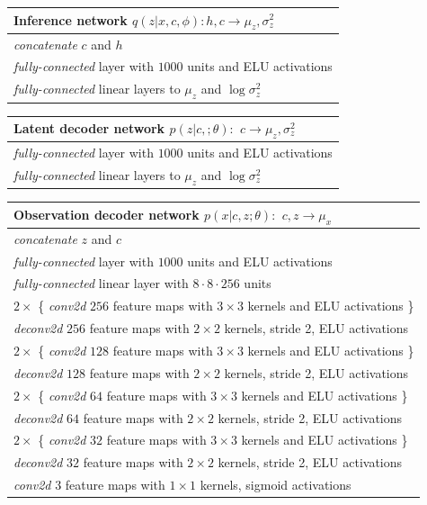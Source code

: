 \documentclass{article} %
\begin{document}
\begin{table}[H]

    \begin{tabular}{  l}
    \bf{Inference network} $q(z | x,c, \phi): h,c \to \mu_z, \sigma^2_z$ \\ \hline
    \emph{concatenate} $c$ and $h$ \\
    \emph{fully-connected} layer with $1000$ units and ELU activations\\
    \emph{fully-connected} linear layers to $\mu_z$ and $\log \sigma^2_z$
    \label{table:faces_inference_network}
    \end{tabular}
\end{table}
\begin{table}[H]

    \begin{tabular}{  l}
    \bf{Latent decoder network} $p(z | c,; \theta):$ $c \to \mu_z, \sigma^2_z$ \\ \hline
    \emph{fully-connected} layer with $1000$ units and ELU activations\\
    \emph{fully-connected} linear layers to $\mu_z$ and $\log \sigma^2_z$
    \label{table:faces_latent_decoder_network}
    \end{tabular}   
\end{table}

\begin{table}[H]

    \begin{tabular}{  l}
    \bf{Observation decoder network} $p(x | c, z ; \theta):$ $c,z \to \mu_x$ \\ \hline
    \emph{concatenate} $z$ and $c$ \\
    \emph{fully-connected} layer with $1000$ units and ELU activations \\
    \emph{fully-connected} linear layer with $8 \cdot 8 \cdot 256$ units \\
    $2 \times$ \{ \emph{conv2d} $256$ feature maps with $3 \times 3$ kernels and ELU activations \} \\
    \emph{deconv2d} $256$ feature maps with $2 \times 2$ kernels, stride 2, ELU activations \\
     $2 \times$ \{ \emph{conv2d} $128$ feature maps with $3 \times 3$ kernels and ELU activations \} \\
    \emph{deconv2d} $128$ feature maps with $2 \times 2$ kernels, stride 2, ELU activations \\   
    $2 \times$ \{ \emph{conv2d} $64$ feature maps with $3 \times 3$ kernels and ELU activations \} \\
    \emph{deconv2d} $64$ feature maps with $2 \times 2$ kernels, stride 2, ELU activations \\
     $2 \times$ \{ \emph{conv2d} $32$ feature maps with $3 \times 3$ kernels and ELU activations \} \\
    \emph{deconv2d} $32$ feature maps with $2 \times 2$ kernels, stride 2, ELU activations \\  
    \emph{conv2d} $3$ feature maps with $1 \times 1$ kernels, sigmoid activations
    \label{table:faces_observation_decoder_network}
    \end{tabular}   
\end{table}
\end{document}
